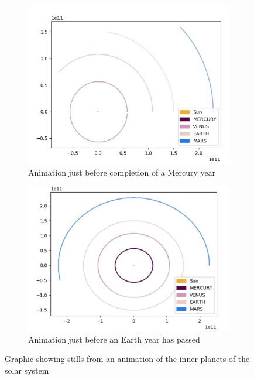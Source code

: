 \documentclass{article}
\begin{document}
               
                \begin{figure}[!ht]
                    \centering
                    \begin{subfigure}{.5\textwidth}
                        \centering
                        \includegraphics[width= 0.9\linewidth]{Figures/PreMercuryCompleteOrbit.png}
                        \caption{Animation just before completion of a Mercury year}
                        \label{subfig:MercuryVsWorld}
                        
                    \end{subfigure}%
                    \begin{subfigure}{.5\textwidth}
                        \centering

                        \includegraphics[width=\linewidth]{Figures/AnimatedExample1.png}
                        \caption{Animation just before an Earth year has passed}
                        \label{SubFig:MarsVsEarth}
                    \end{subfigure}
                    
                    \caption{Graphic showing stills from an animation of the inner planets of the 
                    solar system}
                    \label{fig:AnimationExample}    
                \end{figure}
\end{document}
